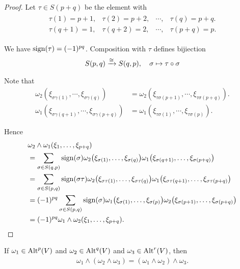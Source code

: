 \begin{proof}
  Let $\tau\in S(p+q)$ be the element with
  \begin{align*}
    \begin{array}{cccc}
      \tau(1)  = p+1 , & \tau(2)  = p+2, & \cdots, & \tau(q) = p+q. \\
      \tau(q+1) = 1,   & \tau(q+2) = 2,  & \cdots, & \tau(p+q) = p.
    \end{array}
  \end{align*}

  We have $\operatorname{sign}(\tau) = (-1)^{pq}$. Composition with $\tau$ defines bijiection
  \begin{align*}
    S(p, q) \xrightarrow[]{\cong} S(q, p), \quad \sigma\mapsto\tau\circ\sigma
  \end{align*}

  Note that
  \begin{align*}
    \omega_2(\xi_{\sigma\gamma(1)}, \cdots, \xi_{\sigma\gamma(q)})
    & = \omega_2(\xi_{\tau\sigma(p+1)}, \cdots, \xi_{\tau\sigma(p+q)}). \\
    \omega_1(\xi_{\sigma\gamma(q+1)}, \cdots, \xi_{\sigma\gamma(p+q)})
    & = \omega_1(\xi_{\tau\sigma(1)}, \cdots, \xi_{\tau\sigma(p)}).
  \end{align*}

  Hence
  \begin{align*}
    & \omega_{2}\wedge\omega_{1}(\xi_{1},\ldots,\xi_{p+q})                                                         \\
    & = \sum_{\sigma\in S(q,p)}\operatorname{sign}(\sigma)\omega_{2}\big(\xi_{\sigma(1)},\ldots,\xi_{\sigma(q)}\big)
  \omega_{1}\big(\xi_{\sigma(q+1)},\ldots,\xi_{\sigma(p+q)}\big)                                                  \\
    & = \sum_{\sigma\in S(p,q)}\operatorname{sign}(\sigma\tau)\omega_{2}\big(\xi_{\sigma\tau(1)},\ldots,\xi_{\sigma\tau(q)}\big)
  \omega_{1}\big(\xi_{\sigma\tau(q+1)},\ldots,\xi_{\sigma\tau(p+q)}\big)                                          \\
    & = (-1)^{pq}\sum_{\sigma\in S(p,q)}\operatorname{sign}(\sigma)\omega_{1}\big(\xi_{\sigma(1)},\ldots,\xi_{\sigma(p)}\big)
  \omega_{2}\big(\xi_{\sigma(p+1)},\ldots,\xi_{\sigma(p+q)}\big)                                                  \\
    & = (-1)^{pq}\omega_{1}\wedge\omega_{2}(\xi_{1},\ldots,\xi_{p+q}).
  \end{align*}
\end{proof}


\begin{lemma}
  If $\omega_1\in\operatorname{Alt}^p(V)$ and $\omega_2\in\operatorname{Alt}^q(V)$ and $\omega_3\in\operatorname{Alt}^r(V)$, then
  \begin{align*}
    \omega_1\wedge(\omega_2\wedge\omega_3) = (\omega_1\wedge\omega_2)\wedge\omega_3.
  \end{align*}
\end{lemma}

